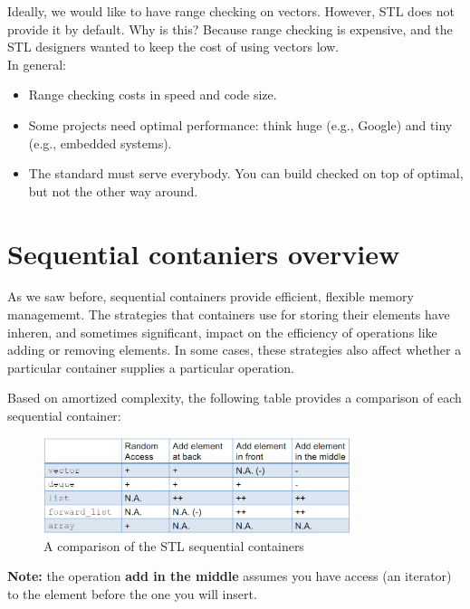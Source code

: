 Ideally, we would like to have range checking on vectors. However, STL does not provide it
by default. Why is this? Because range checking is expensive, and the STL designers wanted
to keep the cost of using vectors low.\\

In general:

\begin{itemize}
    \item Range checking costs in speed and code size.
    \item Some projects need optimal performance: think huge (e.g., Google) and tiny (e.g.,
    embedded systems).
    \item The standard must serve everybody. You can build checked on top of optimal, but
    not the other way around.
\end{itemize}

\section{Sequential contaniers overview}

As we saw before, sequential containers provide efficient, flexible memory managememt. The strategies
that containers use for storing their elements have inheren, and sometimes significant, impact
on the efficiency of operations like adding or removing elements. In some cases, these strategies
also affect whether a particular container supplies a particular operation.

Based on amortized complexity, the following table provides a comparison of each sequential 
container:

\begin{figure}[H]
    \centering
    \includegraphics[width=0.8\textwidth]{figures/sequential_comparison.png}
    \caption{A comparison of the STL sequential containers}
    \label{fig:sequential-comparison}
\end{figure}

\textbf{Note:} the operation \textbf{add in the middle} assumes you have access (an iterator) to
the element before the one you will insert.\\

